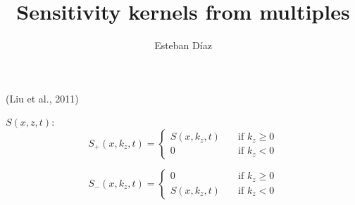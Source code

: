 


\huge
{}
\linethickness{0.2mm}

\title[]{ Sensitivity kernels from multiples }
\author[]{Esteban  D\'{i}az}
\date{}
\logo{}


\def\big#1{\begin{center} \LARGE \textbf{#1} \end{center}}
\def\cen#1{\begin{center}        \textbf{#1} \end{center}}

 { \cwpcover }


\begin{frame}
\end{frame}


\begin{frame}
\end{frame}

\begin{frame}
\end{frame}

\begin{frame}
\end{frame}


\begin{frame}
\end{frame}



\begin{frame}
  (Liu et al., 2011)

  $S(x,z,t)$:
  \[
    S_{+}(x,k_z,t) = 
    \begin{cases}
    S(x,k_z,t)      & \quad \text{if } k_z\geq0\\
    0               & \quad \text{if } k_z < 0
  \end{cases}
  \]

  \[
    S_{-}(x,k_z,t) = 
    \begin{cases}
    0               & \quad \text{if } k_z\geq0\\
    S(x,k_z,t)      & \quad \text{if } k_z < 0
  \end{cases}
  \]
\end{frame}


